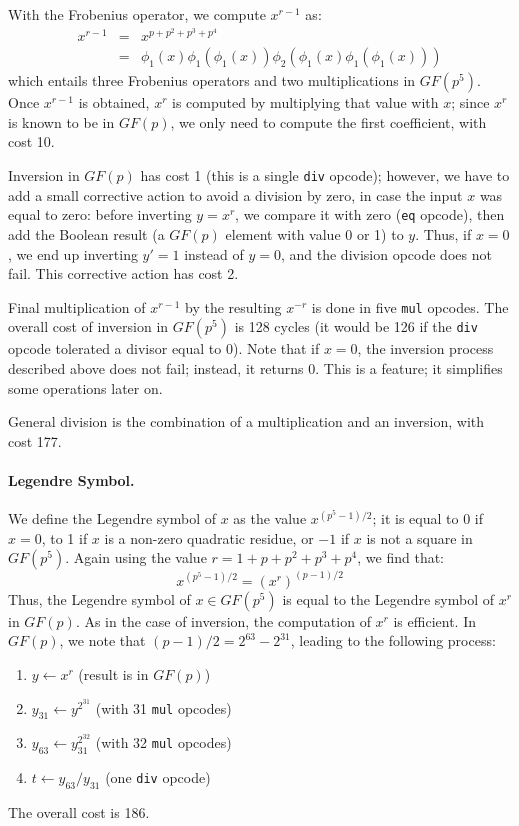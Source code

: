\documentclass{llncs}
\newcommand{\GF}{GF}
\begin{document}
With the Frobenius operator, we compute $x^{r-1}$ as:
\begin{eqnarray*}
    x^{r-1} &=& x^{p + p^2 + p^3 + p^4} \\
            &=& \phi_1(x) \phi_1(\phi_1(x)) \phi_2(\phi_1(x) \phi_1(\phi_1(x)))
\end{eqnarray*}
which entails three Frobenius operators and two multiplications in $\GF(p^5)$.
Once $x^{r-1}$ is obtained, $x^r$ is computed by multiplying that value with
$x$; since $x^r$ is known to be in $\GF(p)$, we only need to compute the
first coefficient, with cost 10.

Inversion in $\GF(p)$ has cost 1 (this is a single \verb+div+ opcode);
however, we have to add a small corrective action to avoid a division by
zero, in case the input $x$ was equal to zero: before inverting $y = x^r$,
we compare it with zero (\verb+eq+ opcode), then add the Boolean result
(a $\GF(p)$ element with value 0 or 1) to $y$. Thus, if $x = 0$, we
end up inverting $y' = 1$ instead of $y = 0$, and the division opcode does
not fail. This corrective action has cost 2.

Final multiplication of $x^{r-1}$ by the resulting $x^{-r}$ is done in
five \verb+mul+ opcodes. The overall cost of inversion in $\GF(p^5)$ is
128 cycles (it would be 126 if the \verb+div+ opcode tolerated a divisor
equal to 0). Note that if $x = 0$, the inversion process described above
does not fail; instead, it returns 0. This is a feature; it simplifies
some operations later on.

General division is the combination of a multiplication and an inversion,
with cost 177.

\paragraph{Legendre Symbol.} We define the Legendre symbol of $x$ as
the value $x^{(p^5 - 1)/2}$; it is equal to 0 if $x = 0$, to 1 if $x$
is a non-zero quadratic residue, or $-1$ if $x$ is not a square in
$\GF(p^5)$. Again using the value $r = 1 + p + p^2 + p^3 + p^4$,
we find that:
\begin{equation*}
    x^{(p^5 - 1)/2} = (x^r)^{(p-1)/2}
\end{equation*}
Thus, the Legendre symbol of $x \in \GF(p^5)$ is equal to the Legendre
symbol of $x^r$ in $\GF(p)$. As in the case of inversion, the computation
of $x^r$ is efficient. In $\GF(p)$, we note that $(p-1)/2 = 2^{63} - 2^{31}$,
leading to the following process:
\begin{enumerate}
    \item $y \leftarrow x^r$ (result is in $\GF(p)$)
    \item $y_{31} \leftarrow y^{2^{31}}$ (with 31 \verb+mul+ opcodes)
    \item $y_{63} \leftarrow y_{31}^{2^{32}}$ (with 32 \verb+mul+ opcodes)
    \item $t \leftarrow y_{63} / y_{31}$ (one \verb+div+ opcode)
\end{enumerate}
The overall cost is 186.
\end{document}
